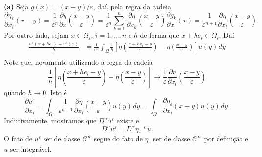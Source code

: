 \documentclass[a4paper, 11pt]{book}
\theoremstyle{definition}
\newcommand{\cC}{\mathcal{C}}
\begin{document}
\begin{prf}
    \textbf{(a)} Seja $g(x) = (x-y)/\varepsilon $, daí, pela regra da cadeia
    \[
        \dfrac{\partial \eta_\varepsilon}{\partial x_i} (x-y) = \frac{1}{\varepsilon^n}\dfrac{\partial \eta}{\partial x}\left( \frac{x - y}{\varepsilon} \right) = \frac{1}{\varepsilon^n} \sum_{k =1}^n \dfrac{\partial \eta}{\partial x_k}\left( \frac{x - y}{\varepsilon} \right) \dfrac{\partial g_k}{\partial x_i}(x) = \frac{1}{\varepsilon^{n+1}} \dfrac{\partial \eta}{\partial x_i}\left( \frac{x - y}{\varepsilon} \right).
    \]
    Por outro lado, sejam $x \in \Omega_\varepsilon$, $i = 1,\dots,n$ e $h$ de forma que $x + he_i \in \Omega_\varepsilon$. Daí
    \[
        \begin{aligned}
            \frac{u^\varepsilon(x + he_i) - u^\varepsilon(x)}{h} 
            &= \frac{1}{\varepsilon^n} \int_\Omega \frac{1}{h}\left[  \eta\left( \frac{x + he_i - y}{\varepsilon} \right) - \eta\left( \frac{x -y}{\varepsilon} \right) \right] u(y) \,dy\\
        \end{aligned}
    \]
    Note que, novamente utilizando a regra da cadeia
    \[
        \frac{1}{h}\left[  \eta\left( \frac{x + he_i - y}{\varepsilon} \right) - \eta\left( \frac{x -y}{\varepsilon} \right) \right] \to \frac{1}{\varepsilon}\dfrac{\partial \eta}{\partial x_i}\left( \frac{x - y}{\varepsilon} \right)
    \]
    quando $h \to 0$. Isto é
    \[
        \dfrac{\partial u^\varepsilon}{\partial x_i} = \int_\Omega \frac{1}{\varepsilon^{n+1}} \dfrac{\partial \eta}{\partial x_i}\left( \frac{x - y}{\varepsilon} \right) u(y) \,dy = \int_\Omega \dfrac{\partial \eta_\varepsilon}{\partial x_i} (x-y) u(y) \,dy.
    \]
    Indutivamente, mostramos que $D^\alpha u^\varepsilon$ existe e
    \[
        D^\alpha u^\varepsilon = D^\alpha\eta_\varepsilon * u.
    \]
    O fato de $u^\varepsilon$ ser de classe $\cC^\infty$ segue do fato de $\eta_\varepsilon$ ser de classe $\cC^\infty$ por definição e $u$ ser integrável.


\end{prf}
\end{document}
